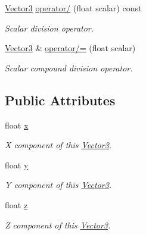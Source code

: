 \begin{DoxyCompactItemize}
\hyperlink{classchaos_1_1gfx_1_1_vector3}{Vector3} \hyperlink{classchaos_1_1gfx_1_1_vector3_abc909457ea9721592932f00502978886}{operator/} (float scalar) const 
\begin{DoxyCompactList}\small\item\em Scalar division operator. \end{DoxyCompactList}\item 
\hyperlink{classchaos_1_1gfx_1_1_vector3}{Vector3} \& \hyperlink{classchaos_1_1gfx_1_1_vector3_a9f61bd9beaabb1de857258d96d46c093}{operator/=} (float scalar)
\begin{DoxyCompactList}\small\item\em Scalar compound division operator. \end{DoxyCompactList}\end{DoxyCompactItemize}
\subsection*{Public Attributes}
\begin{DoxyCompactItemize}
\item 
\hypertarget{classchaos_1_1gfx_1_1_vector3_ac58f0d4a6e611ae3eec8e9f56476fc13}{float \hyperlink{classchaos_1_1gfx_1_1_vector3_ac58f0d4a6e611ae3eec8e9f56476fc13}{x}}\label{classchaos_1_1gfx_1_1_vector3_ac58f0d4a6e611ae3eec8e9f56476fc13}

\begin{DoxyCompactList}\small\item\em X component of this \hyperlink{classchaos_1_1gfx_1_1_vector3}{Vector3}. \end{DoxyCompactList}\item 
\hypertarget{classchaos_1_1gfx_1_1_vector3_ac001a2e7468d6c6cfc5119d486817f0b}{float \hyperlink{classchaos_1_1gfx_1_1_vector3_ac001a2e7468d6c6cfc5119d486817f0b}{y}}\label{classchaos_1_1gfx_1_1_vector3_ac001a2e7468d6c6cfc5119d486817f0b}

\begin{DoxyCompactList}\small\item\em Y component of this \hyperlink{classchaos_1_1gfx_1_1_vector3}{Vector3}. \end{DoxyCompactList}\item 
\hypertarget{classchaos_1_1gfx_1_1_vector3_a7ec457e7ef3054557dacdc89bf7ce77b}{float \hyperlink{classchaos_1_1gfx_1_1_vector3_a7ec457e7ef3054557dacdc89bf7ce77b}{z}}\label{classchaos_1_1gfx_1_1_vector3_a7ec457e7ef3054557dacdc89bf7ce77b}

\begin{DoxyCompactList}\small\item\em Z component of this \hyperlink{classchaos_1_1gfx_1_1_vector3}{Vector3}. \end{DoxyCompactList}\end{DoxyCompactItemize}



